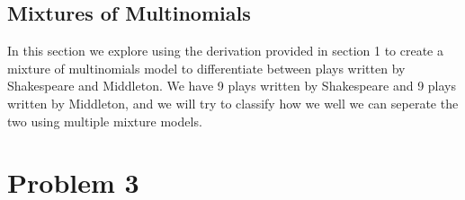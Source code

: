 \documentclass[paper=a4, fontsize=11pt]{scrartcl} %
\begin{document}
\subsection{Mixtures of Multinomials}
In this section we explore using the derivation provided in section 1 to create a mixture of multinomials model to differentiate between plays written by Shakespeare and Middleton.
We have 9 plays written by Shakespeare and 9 plays written by Middleton, and we will try to classify how we well we can seperate the two using multiple mixture models.


\section{Problem 3}
\end{document}
